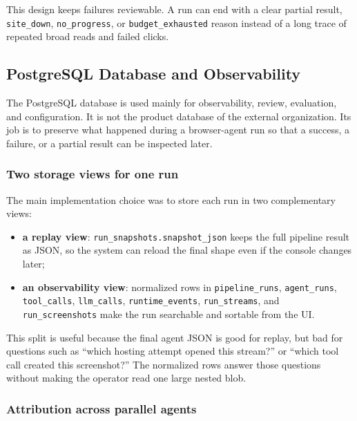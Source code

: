 This design keeps failures reviewable. A run can end with a clear partial result,
\texttt{site\_down}, \texttt{no\_progress}, or \texttt{budget\_exhausted} reason instead
of a long trace of repeated broad reads and failed clicks.

\subsection{PostgreSQL Database and Observability}

The PostgreSQL database is used mainly for observability, review, evaluation, and
configuration. It is not the product database of the external organization. Its job is
to preserve what happened during a browser-agent run so that a success, a failure, or a
partial result can be inspected later.

\subsubsection{Two storage views for one run}

The main implementation choice was to store each run in two complementary views:
\begin{itemize}
  \item \textbf{a replay view}: \texttt{run\_snapshots.snapshot\_json} keeps the full
  pipeline result as JSON, so the system can reload the final shape even if the console
  changes later;
  \item \textbf{an observability view}: normalized rows in \texttt{pipeline\_runs},
  \texttt{agent\_runs}, \texttt{tool\_calls}, \texttt{llm\_calls},
  \texttt{runtime\_events}, \texttt{run\_streams}, and \texttt{run\_screenshots} make
  the run searchable and sortable from the UI.
\end{itemize}

This split is useful because the final agent JSON is good for replay, but bad for
questions such as ``which hosting attempt opened this stream?'' or ``which tool call
created this screenshot?'' The normalized rows answer those questions without making the
operator read one large nested blob.



\subsubsection{Attribution across parallel agents}

